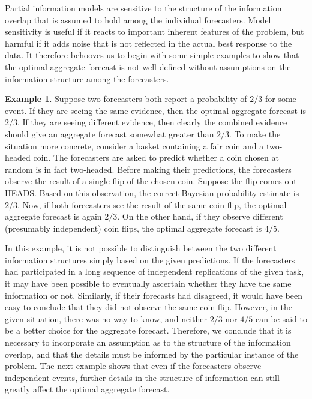 \documentclass[11pt]{article}
\theoremstyle{definition}
\newtheorem{example}[theorem]{Example}
\theoremstyle{definition}
\begin{document}
Partial information models are sensitive to the structure of the
information overlap that is assumed to hold among the individual
forecasters. Model sensitivity is useful if it reacts
to important inherent features of the problem, but harmful if it adds
noise that is not reflected in the actual best response to the data.
It therefore behooves us to begin with some simple examples to show
that the optimal aggregate forecast is not well defined without
assumptions on the information structure among the forecasters.

\begin{example}
\label{FirstExample}
Suppose two forecasters both report a probability of $2/3$ for some
event.  If they are seeing the same evidence, then the optimal aggregate
forecast is $2/3$.  If they are seeing different evidence,
then clearly the combined evidence should give an aggregate forecast
somewhat greater than $2/3$.  To make the situation more concrete, consider a basket containing a fair coin and a two-headed coin. The forecasters are asked to predict whether a coin chosen at random is in fact
two-headed. Before making their predictions, the forecasters observe the result of a single flip of
the chosen coin.  Suppose the flip comes out HEADS. Based on this observation, the correct Bayesian probability estimate is  $2/3$.
 Now, if both forecasters see the
result of the same coin flip, the optimal aggregate forecast
 is again $2/3$. On the other hand, if they observe different (presumably
independent) coin flips, the optimal aggregate forecast 
is $4/5$.
\end{example}
In this example, it is not possible to distinguish between the two different information structures simply based on the given predictions. If the forecasters had participated in a long sequence of independent replications of the given task, it may have been possible to eventually ascertain whether they have the same information or not. Similarly, if their forecasts had disagreed, it would have been easy to conclude that they did not observe the same coin flip.  However, in the given situation, there
was no way to know, and neither $2/3$ nor $4/5$ can be said to be a
better choice for the aggregate forecast.  Therefore, we conclude that it is necessary to incorporate an assumption as to the structure of the information
overlap, and that the details must be informed by the particular
instance of the problem. The next example shows that even if the forecasters observe independent events, further details
in the structure of information can still greatly affect the
optimal aggregate forecast.
\end{document}
